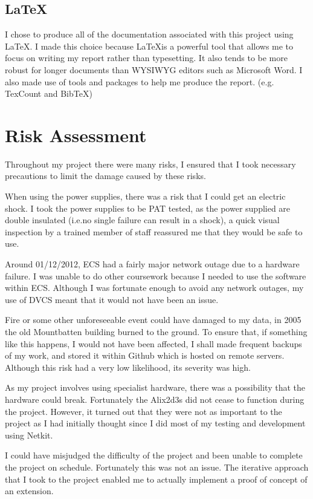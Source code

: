 \documentclass[12pt]{report}
\begin{document}
\subsection{\LaTeX}
I chose to produce all of the documentation associated with this project using
\LaTeX. I made this choice because \LaTeX is a powerful tool that allows me to
focus on writing my report rather than typesetting. It also tends to be more
robust for longer documents than WYSIWYG editors such as Microsoft Word. I also
made use of tools and packages to help me produce the report. (e.g. TexCount
and BibTeX)

\section{Risk Assessment}
Throughout my project there were many risks, I ensured that I took necessary
precautions to limit the damage caused by these risks.

When using the power supplies, there was a risk that I could get an electric
shock. I took the power supplies to be PAT tested, as the power supplied are
double insulated (i.e.\@ no single failure can result in a shock), a quick visual
inspection by a trained member of staff reassured me that they would be safe to
use.

Around 01/12/2012, ECS had a fairly major network outage due to a hardware
failure. I was unable to do other coursework because I needed to use the
software within ECS\@. Although I was fortunate enough to avoid any network
outages, my use of DVCS meant that it would not have been an issue.

Fire or some other unforeseeable event could have damaged to my data, in 2005 the old
Mountbatten building burned to the ground. To ensure that, if something like
this happens, I would not have been affected, I shall made frequent backups of
my work, and stored it within Github which is hosted on remote servers.
Although this risk had a very low likelihood, its severity was high.

As my project involves using specialist hardware, there was a possibility that
the hardware could break. Fortunately the Alix2d3s did not cease to function
during the project. However, it turned out that they were not as important to
the project as I had initially thought since I did most of my testing and
development using Netkit.

I could have misjudged the difficulty of the project and been unable to complete
the project on schedule. Fortunately this was not an issue. The iterative
approach that I took to the project enabled me to actually implement a proof of
concept of an extension.  
\end{document}
